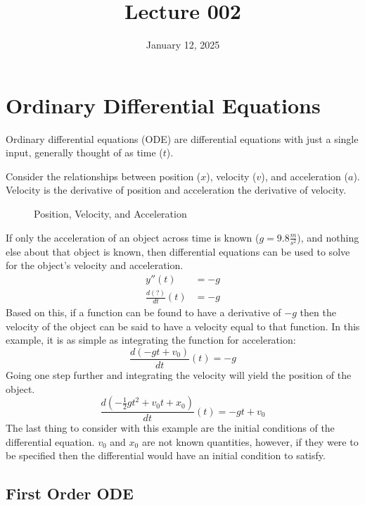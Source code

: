 \documentclass[12pt]{article}
\title{Lecture 002}
\date{January 12, 2025}
\begin{document}
\setcounter{equation}{0}
\newpage

\section{Ordinary Differential Equations}
\label{sec:ordinaryDifferentialEquations}

Ordinary differential equations (ODE) are differential equations with just a single input, generally thought of as time ($t$).

Consider the relationships between {\color{re} position} ($x$), {\color{gr} velocity} ($v$), and {\color{bl} acceleration} ($a$). Velocity is the derivative of position and acceleration the derivative of velocity.

\begin{figure}[H]
  \centering
  
  \caption{Position, Velocity, and Acceleration}
  \label{fig:001}
\end{figure}

If only the acceleration of an object across time is known ($g = 9.8 \frac{m}{s^2}$), and nothing else about that object is known, then differential equations can be used to solve for the object's velocity and acceleration.
\begin{align*}
  y''(t) &= -g \\
  \frac{d(?)}{dt}(t) &= -g
\end{align*}
Based on this, if a function can be found to have a derivative of $-g$ then the velocity of the object can be said to have a velocity equal to that function. In this example, it is as simple as integrating the function for acceleration:
\begin{equation*}
  \frac{d(-gt + v_0)}{dt}(t) = -g
\end{equation*}
Going one step further and integrating the velocity will yield the position of the object.
\begin{equation*}
  \frac{d\left(-\frac{1}{2}gt^2+v_0t+x_0\right)}{dt}(t) = -gt + v_0
\end{equation*}
The last thing to consider with this example are the initial conditions of the differential equation. $v_0$ and $x_0$ are not known quantities, however, if they were to be specified then the differential would have an initial condition to satisfy.

\subsection{First Order ODE}
\label{ssec:firstOrderODE}
\end{document}
